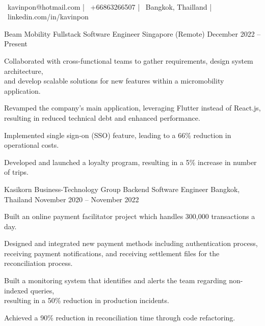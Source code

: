 \documentclass[]{awesome-cv}
\begin{document}
\begin{center}
	  \\
	\vspace{2mm}
	{\faEnvelope\ kavinpon@hotmail.com} | {\faMobile\ +66863266507} | {\faMapMarker\ Bangkok, Thailland} | {\faLinkedin\ linkedin.com/in/kavinpon}
\end{center}
\begin{cventries}
	\cventry
	{Beam Mobility}
	{Fullstack Software Engineer}
	{Singapore (Remote)}
	{December 2022 – Present}
	{\begin{cvitems}
			\item {Collaborated with cross-functional teams to gather requirements, design system architecture,\\ and develop scalable solutions for new features within a micromobility application.}
			\item {Revamped the company's main application, leveraging Flutter instead of React.js,\\ resulting in reduced technical debt and enhanced performance.}
			\item {Implemented single sign-on (SSO) feature, leading to a 66\% reduction in operational costs.}
			\item {Developed and launched a loyalty program, resulting in a 5\% increase in number of trips.}
		\end{cvitems}}
	\cventry
	{Kasikorn Business-Technology Group}
	{Backend Software Engineer}
	{Bangkok, Thailand}
	{November 2020 – November 2022}
	{\begin{cvitems}
			\item {Built an online payment facilitator project which handles 300,000 transactions a day.}
			\item {Designed and integrated new payment methods including authentication process,\\ receiving payment notifications, and receiving settlement files for the reconciliation process.}
			\item {Built a monitoring system that identifies and alerts the team regarding non-indexed queries,\\ resulting in a 50\% reduction in production incidents.}
			\item {Achieved a 90\% reduction in reconciliation time through code refactoring.}

\end{cvitems}}
\end{cventries}
\end{document}

